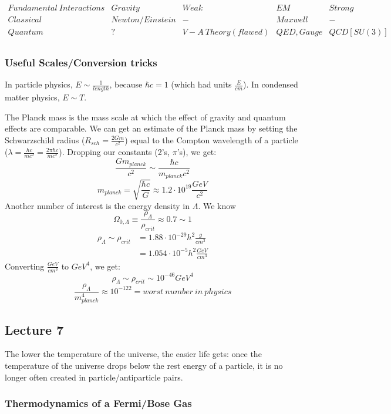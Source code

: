 \documentclass{article}
\def\inv#1{\frac{1}{ #1}}
\def\econs{\Omega_{0,\Lambda}}
\def\econs{\Omega_{0,\Lambda}}
\def\econs{\Omega_{0,\Lambda}}
\def\econs{\Omega_{0,\Lambda}}
\begin{document}
$$\begin{matrix} 
Fundamental\ Interactions&Gravity&Weak&EM&Strong\\
Classical&Newton/Einstein&-&Maxwell&-\\
Quantum&?&V-A\ Theory(flawed)&QED, Gauge&QCD [SU(3)]\\\end{matrix}$$

\subsubsection*{ Useful Scales/Conversion tricks}

In particle physics, $E\sim\inv{length}$, because $\hbar c=1$ (which
had units $\frac{E}{ cm}$).  In condensed matter physics, $E\sim T$.\par
The Planck mass is the mass scale at which the effect of gravity and quantum
effects are comparable.  We can get an estimate of the Planck mass by setting
the Schwarzschild radius ($R_{sch} = \frac{2Gm}{ c^2}$) equal to the Compton
wavelength of a particle ($\lambda = \frac{hc}{ mc^2} = \frac{2\pi\hbar c}{ mc^2}$).
Dropping our constants (2's, $\pi$'s), we get:
$$\frac{Gm_{planck}}{ c^2} \sim \frac{\hbar c}{ m_{planck}c^2}$$
$$m_{planck} = \sqrt{\frac{\hbar c}{ G}} \approx 1.2\cdot 10^{19} \frac{GeV}{ c^2}$$
Another number of interest is the energy density in $\Lambda$.  We know
$$\econs \equiv \frac{\rho_\Lambda}{ \rho_{crit}} \approx 0.7 \sim 1$$
\begin{align}
\rho_\Lambda \sim \rho_{crit} 
&= 1.88\cdot 10^{-29} h^2 \frac{g}{ cm^3}\\
&= 1.054\cdot 10^{-5} h^2 \frac{GeV}{ cm^3}
\end{align}
Converting $\frac{GeV}{ cm^3}$ to $GeV^4$, we get:
$$\rho_\Lambda \sim \rho_{crit} \sim 10^{-46} GeV^4$$
$$\frac{\rho_\Lambda}{ m_{planck}^4} \approx 10^{-122} = worst\ number\ in\ 
physics$$

\subsection{Lecture 7}

The lower the temperature of the universe, the easier life gets: once the 
temperature of the universe drops below the rest energy of a particle, it is
no longer often created in particle/antiparticle pairs.\par

\subsubsection*{ Thermodynamics of a Fermi/Bose Gas}
\end{document}
